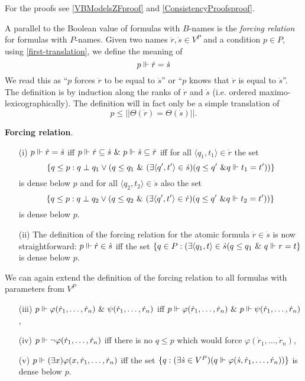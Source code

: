 For the proofs see \ref{VBModelsZFproof} and \ref{ConsistencyProofsproof}.



A parallel to the Boolean value of formulas with $B$-names is the \emph{forcing relation} for formulas with $P$-names. Given two names $\dot{r},\dot{s}\in V^P$ and a condition $p\in P$, using \ref{first-translation},
we define the meaning of
$$
p\Vdash \dot{r}=\dot{s}
$$
We read this as ``$p$ forces $\dot{r}$ to be equal to $\dot{s}$'' or ``$p$ knows that $\dot{r}$ is equal to $\dot{s}$''. The definition
is by induction along the ranks of $\dot{r}$ and $\dot{s}$ (i.e. ordered maximo-lexicographically). The definition will in fact only be a
simple translation of
$$
p\leq ||\Theta(\dot{r})=\Theta(\dot{s})||.
$$
\begin{definition}{\bf Forcing relation}.\label{forcing-relation}
\begin{itemize}
 \item[(i)] $p\Vdash\dot{r}=\dot{s}$ iff $p\force\dot{r}\subseteq\dot{s}\ \&\  p\force\dot{s}\subseteq\dot{r}$ iff for all $\langle q_1,t_1\rangle\in\dot{r}$
 the set
 $$
    \{q\leq p: q\perp q_1\vee (q\leq q_1\ \&\ (\exists\langle q^\prime,t^\prime\rangle\in\dot{s})(q\leq q^\prime\ \& q\Vdash t_1=t^\prime))\}
 $$
 is dense below $p$ and for all $\langle q_2,t_2\rangle\in\dot{s}$ also the set
 $$
    \{q\leq p: q\perp q_2\vee (q\leq q_2\ \&\ (\exists\langle q^\prime,t^\prime\rangle\in\dot{r})(q\leq q^\prime\ \& q\Vdash t_2=t^\prime))\}
 $$
 is dense below $p$.
 \item[(ii)] The definition of the forcing relation for the atomic formula $\dot{r}\in\dot{s}$ is now straightforward:
 $p\Vdash\dot{r}\in\dot{s}$ iff the set $\{q\in P:(\exists \langle q_1,t\rangle\in\dot{s}(q\leq q_1\ \&\ q\Vdash r=t\}$ is dense below $p$.
\end{itemize}

We can again extend the definition of the forcing relation to all formulas with parameters from $V^P$
\begin{itemize}
 \item[(iii)] $p\force\varphi(\dot{r}_1,\ldots,\dot{r}_n)\ \&\ \psi(\dot{r}_1,\ldots,\dot{r}_n)$ iff
              $p\force\varphi(\dot{r}_1,\ldots,\dot{r}_n)\ \&\ p\force \psi(\dot{r}_1,\ldots,\dot{r}_n)$,
 \item[(iv)]  $p\Vdash\neg\varphi(\dot{r}_1,\ldots,\dot{r}_n)$ iff there is no $q\leq p$ which would force $\varphi(\dot{r}_1,\ldots,\dot{r}_n)$,
 \item[(v)]   $p\Vdash(\exists x)\varphi(x,\dot{r}_1,\ldots,\dot{r}_n)$ iff the set $\{q:(\exists\dot{s}\in V^P)(q\Vdash \varphi(\dot{s},\dot{r}_1,\ldots,\dot{r}_n))\}$
              is dense below $p$.
\end{itemize}
\end{definition}

